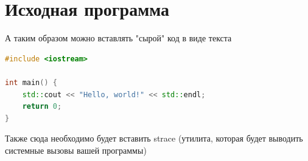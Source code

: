\section{Исходная программа}


\begin{center}

\end{center}

А таким образом можно вставлять "сырой" код в виде текста
\begin{lstlisting}[language=C++]
#include <iostream>

int main() {
    std::cout << "Hello, world!" << std::endl;
    return 0;
}
\end{lstlisting}

Также сюда необходимо будет вставить strace (утилита, которая будет выводить системные вызовы вашей программы)